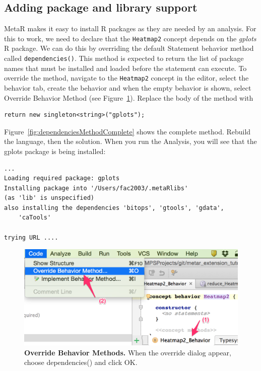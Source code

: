 \subsection{Adding package and library support}
MetaR makes it easy to install R packages as they are needed by an analysis. For this to work, we need to declare that the \texttt{Heatmap2} concept depends on the \textit{gplots} R package.  We can do this by overriding the default Statement behavior method called \texttt{dependencies()}. This method is expected to return the list of package names that must be installed and loaded before the statement can execute. To override the method, navigate to the \texttt{Heatmap2} concept in the editor, select the behavior tab, create the behavior and when the empty behavior is shown, select Override Behavior Method (see Figure~\ref{fig:CreateBehaviorAndOverride}).
Replace the body of the method with 
\begin{lstlisting}
return new singleton<string>("gplots");
\end{lstlisting}
Figure~\ref{fig:dependenciesMethodComplete} shows the complete  method. Rebuild the language, then the solution. When you run the Analysis, you will see that the gplots package is being installed:
\begin{lstlisting}
...
Loading required package: gplots
Installing package into '/Users/fac2003/.metaRlibs'
(as 'lib' is unspecified)
also installing the dependencies 'bitops', 'gtools', 'gdata', 
    'caTools'

trying URL ....
\end{lstlisting}

\begin{figure}
  \centering
  \includegraphics[width=\figWidthNarrow]{figures/CreateBehaviorAndOverride.png}
\caption[Override Behavior Methods.]{\textbf{Override Behavior Methods.} When the override dialog appear, choose dependencies() and click OK.}
\label{fig:CreateBehaviorAndOverride}
\end{figure}


